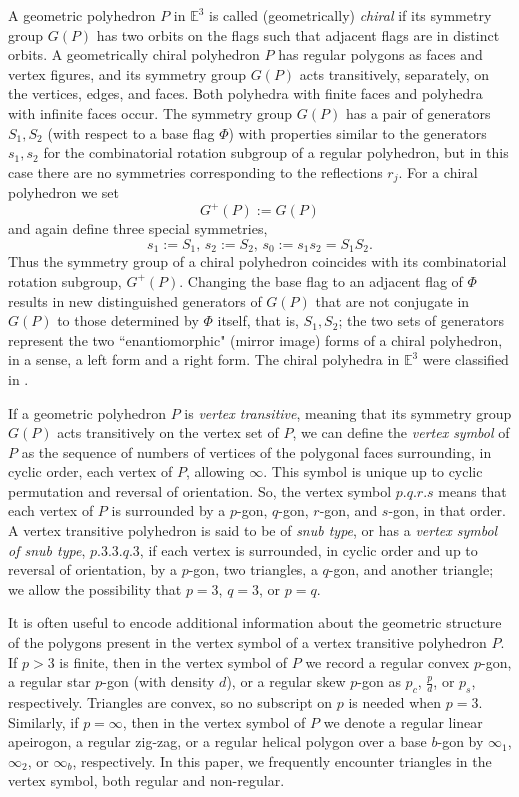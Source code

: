 \documentclass[12pt]{article}
\theoremstyle{definition}\newtheorem{definition}{Definition}[section]
\begin{document}
A geometric polyhedron $P$ in $\mathbb{E}^3$ is called (geometrically) \textit{chiral} if its symmetry group $G(P)$ has two orbits on the flags such that adjacent flags are in distinct orbits. A geometrically chiral polyhedron $P$ has regular polygons as faces and vertex figures, and its symmetry group $G(P)$ acts transitively, separately, on the vertices, edges, and faces. Both polyhedra with finite faces and polyhedra with infinite faces occur. The symmetry group $G(P)$ has a pair of generators $S_1,S_2$ (with respect to a base flag $\Phi$) with properties similar to the generators $s_1,s_2$ for the combinatorial rotation subgroup of a regular polyhedron, but in this case there are no symmetries corresponding to the reflections $r_j$. 
For a chiral polyhedron we set
\[G^{+}(P):=G(P)\]
and again define three special symmetries, 
\[s_1:=S_1,\, s_2:= S_2,\, s_0:=s_{1}s_{2}=S_1S_2.\] 
Thus the symmetry group of a chiral polyhedron coincides with its combinatorial rotation subgroup, $G^+(P)$. Changing the base flag to an adjacent flag of $\Phi$ results in new distinguished generators of $G(P)$ that are not conjugate in $G(P)$ to those determined by $\Phi$ itself, that is, $S_1,S_2$; the two sets of generators represent the two ``enantiomorphic" (mirror image) forms of a chiral polyhedron, in a sense, a left form and a right form. The chiral polyhedra in $\mathbb{E}^3$ were classified in \cite{Chiral 1,Chiral 2}.\smallskip

If a geometric polyhedron $P$ is \textit{vertex transitive}, meaning that its symmetry group $G(P)$ acts transitively on the vertex set of $P$, we can define the \textit{vertex symbol} of $P$ as the sequence of numbers of vertices of the polygonal faces surrounding, in cyclic order, each vertex of $P$, allowing $\infty$. This symbol is unique up to cyclic permutation and reversal of orientation. So, the vertex symbol $p.q.r.s$ means that each vertex of $P$ is surrounded by a $p$-gon, $q$-gon, $r$-gon, and $s$-gon, in that order. A vertex transitive  polyhedron is said to be of \textit{snub type}, or has a \textit{vertex symbol of snub type}, $p.3.3.q.3$, if each vertex is surrounded, in cyclic order and up to reversal of orientation, by a $p$-gon, two triangles, a $q$-gon, and another triangle; we allow the possibility that $p=3$, $q=3$, or $p=q$.
\smallskip

It is often useful to encode additional information about the geometric structure of the polygons present in the vertex symbol of a vertex transitive polyhedron $P$. If $p > 3$ is finite, then in the vertex symbol of $P$ we record a regular convex $p$-gon, a regular star $p$-gon (with density $d$), or a regular skew $p$-gon as $p_c$, $\frac{p}{d}$, or $p_s$, respectively. Triangles are convex, so no subscript on $p$ is needed when $p=3$. Similarly, if $p=\infty$, then in the vertex symbol of $P$ we denote a regular linear apeirogon, a regular zig-zag, or a regular helical polygon over a base $b$-gon by $\infty_1$, $\infty_2$, or $\infty_b$, respectively. In this paper, we frequently encounter triangles in the vertex symbol, both regular and non-regular. \smallskip 
\end{document}
